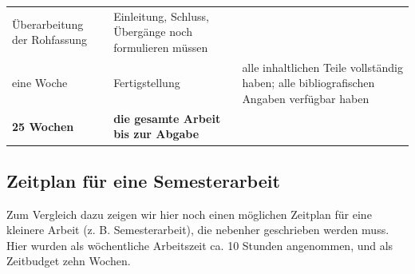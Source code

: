 \documentclass[]{book}
\theoremstyle{definition}
\theoremstyle{definition}
\theoremstyle{definition}
\theoremstyle{remark}
\begin{document}
\begin{longtable}[]{@{}lll@{}}
\begin{minipage}[t]{0.35\columnwidth}
Überarbeitung der Rohfassung\strut
\end{minipage} & \begin{minipage}[t]{0.41\columnwidth}\raggedright\strut
Einleitung, Schluss, Übergänge noch formulieren müssen\vspace{5mm}\strut
\end{minipage}\tabularnewline
\begin{minipage}[t]{0.16\columnwidth}\raggedright\strut
eine Woche\strut
\end{minipage} & \begin{minipage}[t]{0.35\columnwidth}\raggedright\strut
Fertigstellung\strut
\end{minipage} & \begin{minipage}[t]{0.41\columnwidth}\raggedright\strut
alle inhaltlichen Teile vollständig haben; alle bibliografischen Angaben
verfügbar haben\vspace{5mm}\strut
\end{minipage}\tabularnewline
\begin{minipage}[t]{0.16\columnwidth}\raggedright\strut
\textbf{25 Wochen}\strut
\end{minipage} & \begin{minipage}[t]{0.35\columnwidth}\raggedright\strut
\textbf{die gesamte Arbeit bis zur Abgabe}\strut
\end{minipage} & \begin{minipage}[t]{0.41\columnwidth}\raggedright\strut
\strut
\end{minipage}\tabularnewline
\bottomrule
\end{longtable}

\subsection{Zeitplan für eine
Semesterarbeit}\label{zeitplan-fur-eine-semesterarbeit}

Zum Vergleich dazu zeigen wir hier noch einen möglichen Zeitplan für
eine kleinere Arbeit (z. B. Semesterarbeit), die nebenher geschrieben
werden muss. Hier wurden als wöchentliche Arbeitszeit ca. 10 Stunden
angenommen, und als Zeitbudget zehn Wochen.
\end{document}
